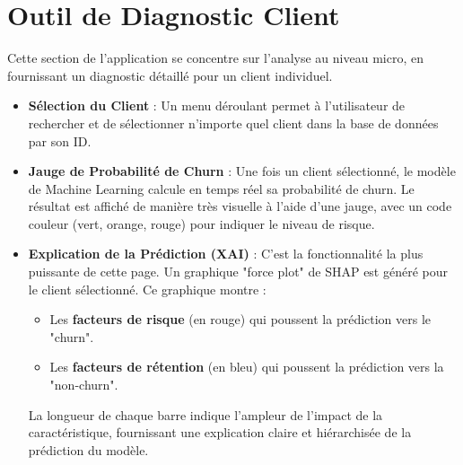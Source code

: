 \section{Outil de Diagnostic Client}
Cette section de l'application se concentre sur l'analyse au niveau micro, en fournissant un diagnostic détaillé pour un client individuel.
\begin{itemize}
    \item \textbf{Sélection du Client} : Un menu déroulant permet à l'utilisateur de rechercher et de sélectionner n'importe quel client dans la base de données par son ID.
    \item \textbf{Jauge de Probabilité de Churn} : Une fois un client sélectionné, le modèle de Machine Learning calcule en temps réel sa probabilité de churn. Le résultat est affiché de manière très visuelle à l'aide d'une jauge, avec un code couleur (vert, orange, rouge) pour indiquer le niveau de risque.
    \item \textbf{Explication de la Prédiction (XAI)} : C'est la fonctionnalité la plus puissante de cette page. Un graphique "force plot" de SHAP est généré pour le client sélectionné. Ce graphique montre :
    \begin{itemize}
        \item Les \textbf{facteurs de risque} (en rouge) qui poussent la prédiction vers le "churn".
        \item Les \textbf{facteurs de rétention} (en bleu) qui poussent la prédiction vers la "non-churn".
    \end{itemize}
    La longueur de chaque barre indique l'ampleur de l'impact de la caractéristique, fournissant une explication claire et hiérarchisée de la prédiction du modèle.
\end{itemize}
